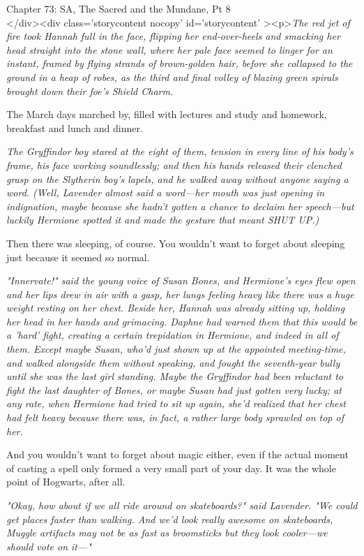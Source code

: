 
Chapter 73: SA, The Sacred and the Mundane, Pt 8\\
</div><div  class='storycontent nocopy' id='storycontent' ><p>\emph{The red jet 
of fire took Hannah full in the face, flipping her end-over-heels and smacking 
her head straight into the stone wall, where her pale face seemed to linger for 
an instant, framed by flying strands of brown-golden hair, before she collapsed 
to the ground in a heap of robes, as the third and final volley of blazing 
green spirals brought down their foe's Shield Charm.}

The March days marched by, filled with lectures and study and homework, 
breakfast and lunch and dinner.

\emph{The Gryffindor boy stared at the eight of them, tension in every line of 
his body's frame, his face working soundlessly; and then his hands released 
their clenched grasp on the Slytherin boy's lapels, and he walked away without 
anyone saying a word. (Well, Lavender almost said a word---her mouth was just 
opening in indignation, maybe because she hadn't gotten a chance to declaim her 
speech---but luckily Hermione spotted it and made the gesture that meant SHUT 
UP.)}

Then there was sleeping, of course. You wouldn't want to forget about sleeping 
just because it seemed so normal.

\emph{"Innervate!" said the young voice of Susan Bones, and Hermione's eyes 
flew open and her lips drew in air with a gasp, her lungs feeling heavy like 
there was a huge weight resting on her chest. Beside her, Hannah was already 
sitting up, holding her head in her hands and grimacing. Daphne had warned them 
that this would be a 'hard' fight, creating a certain trepidation in Hermione, 
and indeed in all of them. Except maybe Susan, who'd just shown up at the 
appointed meeting-time, and walked alongside them without speaking, and fought 
the seventh-year bully until she was the last girl standing. Maybe the 
Gryffindor had been reluctant to fight the last daughter of Bones, or maybe 
Susan had just gotten very lucky; at any rate, when Hermione had tried to sit 
up again, she'd realized that her chest had felt heavy because there was, in 
fact, a rather large body sprawled on top of her.}

And you wouldn't want to forget about magic either, even if the actual moment 
of casting a spell only formed a very small part of your day. It was the whole 
point of Hogwarts, after all.

\emph{"Okay, how about if we all ride around on skateboards?" said Lavender. 
"We could get places faster than walking. And we'd look really awesome on 
skateboards, Muggle artifacts may not be as fast as broomsticks but they look 
cooler---we should vote on it---"}


